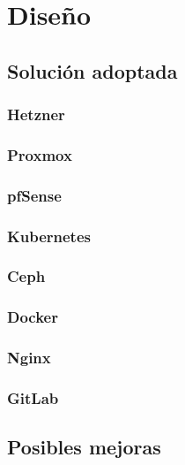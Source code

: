 \chapter {Diseño}

\section{Solución adoptada}
	\subsection{Hetzner}
	\subsection{Proxmox}
	\subsection{pfSense}
	\subsection{Kubernetes}
	\subsection{Ceph}
	\subsection{Docker}
	\subsection{Nginx}
	\subsection{GitLab}
\section{Posibles mejoras}
